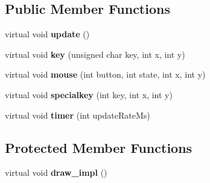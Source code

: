 \subsection*{Public Member Functions}
\begin{DoxyCompactItemize}
\item 
virtual void {\bfseries update} ()\label{classSoundfieldViewer_1_1ShaderSoundfieldViewer_a80def99bd7f3683b6e921a15f2bed27b}

\item 
virtual void {\bfseries key} (unsigned char key, int x, int y)\label{classSoundfieldViewer_1_1ShaderSoundfieldViewer_a6b8565588ad7c1582d48f8e0d03cd288}

\item 
virtual void {\bfseries mouse} (int button, int state, int x, int y)\label{classSoundfieldViewer_1_1ShaderSoundfieldViewer_a578fca4c11dda76419bfa1aa6aebeb8e}

\item 
virtual void {\bfseries specialkey} (int key, int x, int y)\label{classSoundfieldViewer_1_1ShaderSoundfieldViewer_ae2635b3ae60febbb41368518eb6f0725}

\item 
virtual void {\bfseries timer} (int update\-Rate\-Ms)\label{classSoundfieldViewer_1_1ShaderSoundfieldViewer_a1535821f57e216de806903fdf734a1fc}

\end{DoxyCompactItemize}
\subsection*{Protected Member Functions}
\begin{DoxyCompactItemize}
\item 
virtual void {\bfseries draw\-\_\-impl} ()\label{classSoundfieldViewer_1_1ShaderSoundfieldViewer_a1c51d7a3b23105bcd489fc003524ead2}

\end{DoxyCompactItemize}
